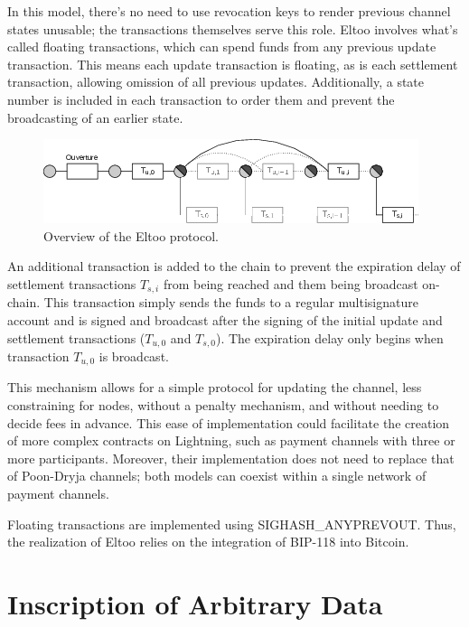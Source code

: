 \documentclass[
  a5paper,
  smalldemyvopaper,10pt,twoside,onecolumn,openright,extrafontsizes,hidelinks]{memoir}
\begin{document}
In this model, there's no need to use revocation keys to render previous
channel states unusable; the transactions themselves serve this role.
Eltoo involves what's called floating transactions, which can spend
funds from any previous update transaction. This means each update
transaction is floating, as is each settlement transaction, allowing
omission of all previous updates. Additionally, a state number is
included in each transaction to order them and prevent the broadcasting
of an earlier state.

\begin{figure}

{\centering \includegraphics{chapters/img/eltoo-offchain-protocol.png}

}

\caption{Overview of the Eltoo protocol.}

\end{figure}%

An additional transaction is added to the chain to prevent the
expiration delay of settlement transactions \(T_{s,i}\) from being
reached and them being broadcast on-chain. This transaction simply sends
the funds to a regular multisignature account and is signed and
broadcast after the signing of the initial update and settlement
transactions (\(T_{u,0}\) and \(T_{s,0}\)). The expiration delay only
begins when transaction \(T_{u,0}\) is broadcast.

This mechanism allows for a simple protocol for updating the channel,
less constraining for nodes, without a penalty mechanism, and without
needing to decide fees in advance. This ease of implementation could
facilitate the creation of more complex contracts on Lightning, such as
payment channels with three or more participants. Moreover, their
implementation does not need to replace that of Poon-Dryja channels;
both models can coexist within a single network of payment channels.

Floating transactions are implemented using SIGHASH\_ANYPREVOUT. Thus,
the realization of Eltoo relies on the integration of BIP-118 into
Bitcoin.

\section*{Inscription of Arbitrary
Data}\label{inscription-of-arbitrary-data}
\end{document}

